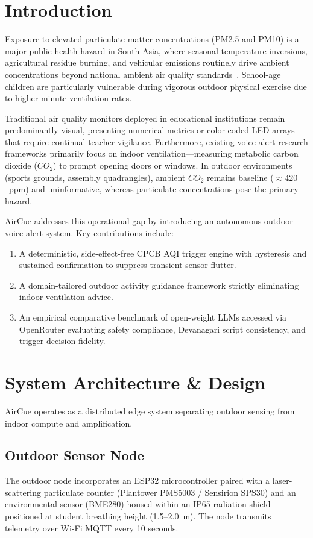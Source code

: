 \documentclass[conference]{IEEEtran}
\begin{document}
\section{Introduction}
Exposure to elevated particulate matter concentrations (PM2.5 and PM10) is a major public health hazard in South Asia, where seasonal temperature inversions, agricultural residue burning, and vehicular emissions routinely drive ambient concentrations beyond national ambient air quality standards~\cite{CPCB2014NAQI, WHO2021AQG}. School-age children are particularly vulnerable during vigorous outdoor physical exercise due to higher minute ventilation rates.

Traditional air quality monitors deployed in educational institutions remain predominantly visual, presenting numerical metrics or color-coded LED arrays that require continual teacher vigilance. Furthermore, existing voice-alert research frameworks primarily focus on indoor ventilation—measuring metabolic carbon dioxide ($CO_2$) to prompt opening doors or windows. In outdoor environments (sports grounds, assembly quadrangles), ambient $CO_2$ remains baseline ($\approx 420$~ppm) and uninformative, whereas particulate concentrations pose the primary hazard.

AirCue addresses this operational gap by introducing an autonomous outdoor voice alert system. Key contributions include:
\begin{enumerate}
    \item A deterministic, side-effect-free CPCB AQI trigger engine with hysteresis and sustained confirmation to suppress transient sensor flutter.
    \item A domain-tailored outdoor activity guidance framework strictly eliminating indoor ventilation advice.
    \item An empirical comparative benchmark of open-weight LLMs accessed via OpenRouter evaluating safety compliance, Devanagari script consistency, and trigger decision fidelity.
\end{enumerate}

\section{System Architecture \& Design}
AirCue operates as a distributed edge system separating outdoor sensing from indoor compute and amplification.

\subsection{Outdoor Sensor Node}
The outdoor node incorporates an ESP32 microcontroller paired with a laser-scattering particulate counter (Plantower PMS5003 / Sensirion SPS30) and an environmental sensor (BME280) housed within an IP65 radiation shield positioned at student breathing height (1.5--2.0~m). The node transmits telemetry over Wi-Fi MQTT every 10 seconds.
\end{document}
